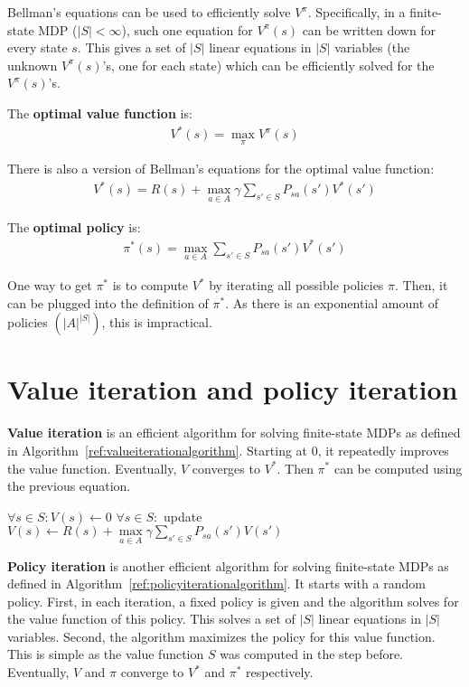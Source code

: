 \documentclass{report}
\begin{document}
Bellman's equations can be used to efficiently solve $V^{\pi}$. Specifically, in a finite-state MDP ($\vert S\vert < \infty$), such one equation for $V^{\pi}(s)$ can be written down for every state $s$. This gives a set of $\vert S\vert$ linear equations in $\vert S\vert$ variables (the unknown $V^{\pi}(s)$'s, one for each state) which can be efficiently solved for the $V^{\pi}(s)$'s.

The {\bf optimal value function} is:
\begin{align*}
V^{*}(s) = \max\limits_{\pi} V^{\pi}(s)
\end{align*}

There is also a version of Bellman's equations for the optimal value function:
\begin{align*}
V^{*}(s) = R(s)+\max\limits_{a\in A} \gamma \sum_{s'\in S} P_{sa}(s')V^{*}(s')
\end{align*}

The {\bf optimal policy} is:
\begin{align*}
\pi^{*}(s) = \max\limits_{a\in A} \sum_{s'\in S} P_{sa}(s')V^{*}(s')
\end{align*}

One way to get $\pi^{*}$ is to compute $V^{*}$ by iterating all possible policies $\pi$. Then, it can be plugged into the definition of $\pi^{*}$. As there is an exponential amount of policies $(\vert A\vert^{\vert S \vert})$, this is impractical.

\section{Value iteration and policy iteration}
{\bf Value iteration} is an efficient algorithm for solving finite-state MDPs as defined in Algorithm~\ref{ref:valueiterationalgorithm}. Starting at 0, it repeatedly improves the value function. Eventually, $V$ converges to $V^{*}$. Then $\pi^{*}$ can be computed using the previous equation.

\begin{algorithm}[h!]
\caption{Value iteration}
\label{ref:valueiterationalgorithm}
\begin{algorithmic}
\State $\forall s\in S: V(s) \gets 0$
\Repeat
\State $\forall s\in S:$ update $V(s) \gets R(s) + \max\limits_{a\in A} \gamma \sum_{s'\in S} P_{sa}(s')V(s')$
\end{algorithmic}
\end{algorithm}

{\bf Policy iteration} is another efficient algorithm for solving finite-state MDPs as defined in Algorithm~\ref{ref:policyiterationalgorithm}. It starts with a random policy. First, in each iteration, a fixed policy is given and the algorithm solves for the value function of this policy. This solves a set of $\vert S\vert$ linear equations in $\vert S\vert$ variables. Second, the algorithm maximizes the policy for this value function. This is simple as the value function $S$ was computed in the step before. Eventually, $V$ and $\pi$ converge to $V^{*}$ and $\pi^{*}$ respectively.
\end{document}
